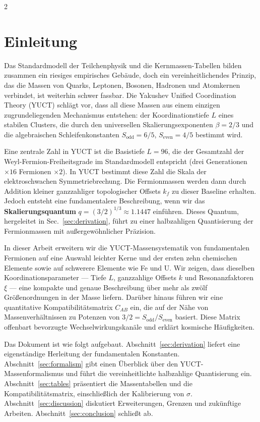 \documentclass[11pt,a4paper]{article}
\begin{document}
	\vspace{0.4cm}
	
	\begin{multicols}{2}
		
		\section{Einleitung}
		
		Das Standardmodell der Teilchenphysik und die Kernmassen-Tabellen bilden zusammen ein riesiges empirisches Gebäude, doch ein vereinheitlichendes Prinzip, das die Massen von Quarks, Leptonen, Bosonen, Hadronen und Atomkernen verbindet, ist weiterhin schwer fassbar. Die Yakushev Unified Coordination Theory (YUCT) schlägt vor, dass all diese Massen aus einem einzigen zugrundeliegenden Mechanismus entstehen: der Koordinationstiefe \(L\) eines stabilen Clusters, die durch den universellen Skalierungsexponenten \(\beta = 2/3\) und die algebraischen Schleifenkonstanten \(S_{\mathrm{odd}}=6/5\), \(S_{\mathrm{even}}=4/5\) bestimmt wird.
		
		Eine zentrale Zahl in YUCT ist die Basistiefe \(L = 96\), die der Gesamtzahl der Weyl-Fermion-Freiheitsgrade im Standardmodell entspricht (drei Generationen $\times 16$ Fermionen $\times 2$). In YUCT bestimmt diese Zahl die Skala der elektroschwachen Symmetriebrechung. Die Fermionmassen werden dann durch Addition kleiner ganzzahliger topologischer Offsets \(k_f\) zu dieser Baseline erhalten. Jedoch entsteht eine fundamentalere Beschreibung, wenn wir das \textbf{Skalierungsquantum} \(q = (3/2)^{1/3} \approx 1.1447\) einführen. Dieses Quantum, hergeleitet in Sec.~\ref{sec:derivation}, führt zu einer halbzahligen Quantisierung der Fermionmassen mit außergewöhnlicher Präzision.
		
		In dieser Arbeit erweitern wir die YUCT-Massensystematik von fundamentalen Fermionen auf eine Auswahl leichter Kerne und der ersten zehn chemischen Elemente sowie auf schwerere Elemente wie Fe und U. Wir zeigen, dass dieselben Koordinationsparameter — Tiefe \(L\), ganzzahlige Offsets \(k\) und Resonanzfaktoren \(\xi\) — eine kompakte und genaue Beschreibung über mehr als zwölf Größenordnungen in der Masse liefern. Darüber hinaus führen wir eine quantitative Kompatibilitätsmatrix \(C_{AB}\) ein, die auf der Nähe von Massenverhältnissen zu Potenzen von \(3/2 = S_{\mathrm{odd}}/S_{\mathrm{even}}\) basiert. Diese Matrix offenbart bevorzugte Wechselwirkungskanäle und erklärt kosmische Häufigkeiten.
		
		Das Dokument ist wie folgt aufgebaut. Abschnitt~\ref{sec:derivation} liefert eine eigenständige Herleitung der fundamentalen Konstanten. Abschnitt~\ref{sec:formalism} gibt einen Überblick über den YUCT-Massenformalismus und führt die vereinheitlichte halbzahlige Quantisierung ein. Abschnitt~\ref{sec:tables} präsentiert die Massentabellen und die Kompatibilitätsmatrix, einschließlich der Kalibrierung von \(\sigma\). Abschnitt~\ref{sec:discussion} diskutiert Erweiterungen, Grenzen und zukünftige Arbeiten. Abschnitt~\ref{sec:conclusion} schließt ab.
		

\end{multicols}
\end{document}
